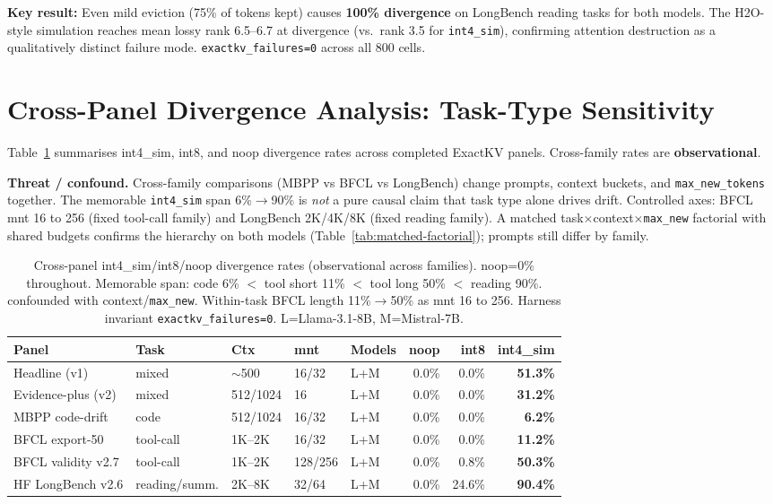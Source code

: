 \documentclass[11pt]{article}
\begin{document}
\textbf{Key result:} Even mild eviction (75\% of tokens kept) causes \textbf{100\%
divergence} on LongBench reading tasks for both models. The H2O-style simulation
reaches mean lossy rank 6.5--6.7 at divergence (vs.\ rank 3.5 for \texttt{int4\_sim}),
confirming attention destruction as a qualitatively distinct failure mode.
\texttt{exactkv\_failures=0} across all 800 cells.

\section{Cross-Panel Divergence Analysis: Task-Type Sensitivity}

Table~\ref{tab:cross-panel} summarises int4\_sim, int8, and noop divergence rates
across completed ExactKV panels. Cross-family rates are \textbf{observational}.

\noindent\textbf{Threat / confound.} Cross-family comparisons (MBPP vs BFCL vs LongBench)
change prompts, context buckets, and \texttt{max\_new\_tokens} together. The memorable
\texttt{int4\_sim} span 6\%$\to$90\% is \emph{not} a pure causal claim that task type alone
drives drift. Controlled axes: BFCL mnt 16 to 256 (fixed tool-call family) and LongBench
2K/4K/8K (fixed reading family). A matched task$\times$context$\times$\texttt{max\_new}
factorial with shared budgets confirms the hierarchy on both models
(Table~\ref{tab:matched-factorial}); prompts still differ by family.

\begin{table}[htbp]
\centering\small\setlength\tabcolsep{4pt}
\renewcommand{\arraystretch}{1.05}
\begin{tabular}{lllllrrr}
\toprule
\textbf{Panel} & \textbf{Task} & \textbf{Ctx} & \textbf{mnt} & \textbf{Models} & \textbf{noop} & \textbf{int8} & \textbf{int4\_sim} \\
\midrule
Headline (v1) & mixed & $\sim$500 & 16/32 & L+M & 0.0\% & 0.0\% & \textbf{51.3\%} \\
Evidence-plus (v2) & mixed & 512/1024 & 16 & L+M & 0.0\% & 0.0\% & \textbf{31.2\%} \\
MBPP code-drift & code & 512/1024 & 16/32 & L+M & 0.0\% & 0.0\% & \textbf{6.2\%} \\
BFCL export-50 & tool-call & 1K--2K & 16/32 & L+M & 0.0\% & 0.0\% & \textbf{11.2\%} \\
BFCL validity v2.7 & tool-call & 1K--2K & 128/256 & L+M & 0.0\% & 0.8\% & \textbf{50.3\%} \\
HF LongBench v2.6 & reading/summ. & 2K--8K & 32/64 & L+M & 0.0\% & 24.6\% & \textbf{90.4\%} \\
\bottomrule
\end{tabular}
\caption{Cross-panel int4\_sim/int8/noop divergence rates (observational across families).
noop=0\% throughout. Memorable span: code 6\% $<$ tool short 11\% $<$ tool long 50\% $<$
reading 90\%. confounded with context/\texttt{max\_new}. Within-task BFCL length
11\%$\to$50\% as mnt 16 to 256. Harness invariant \texttt{exactkv\_failures=0}.
L=Llama-3.1-8B, M=Mistral-7B.}
\label{tab:cross-panel}
\end{table}
\end{document}
